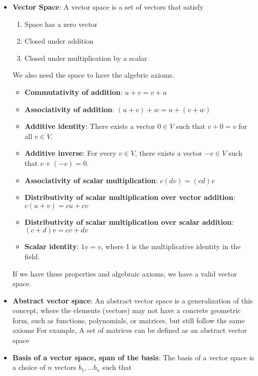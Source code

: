 \documentclass{report}
\begin{document}
    \pagebreak 
    \begin{itemize}
        \item \textbf{Vector Space}: A vector space is a set of vectors that satisfy
            \begin{enumerate}
                \item Space has a zero vector
                \item Closed under addition
                \item Closed under multiplication by a scalar
            \end{enumerate}
            We also need the space to have the algebric axioms.
            \begin{itemize}
                \item \textbf{Commutativity of addition}: \( u + v = v + u \)
                \item \textbf{Associativity of addition}: \( (u + v) + w = u + (v + w) \)
                \item \textbf{Additive identity}: There exists a vector \( 0 \in V \) such that \( v + 0 = v \) for all \( v \in V \).
                \item \textbf{Additive inverse}: For every \( v \in V \), there exists a vector \( -v \in V \) such that \( v + (-v) = 0 \).
                \item \textbf{Associativity of scalar multiplication}: \( c(dv) = (cd)v \)
                \item \textbf{Distributivity of scalar multiplication over vector addition}: \( c(u + v) = cu + cv \)
                \item \textbf{Distributivity of scalar multiplication over scalar addition}: \( (c + d)v = cv + dv \)
                \item \textbf{Scalar identity}: \( 1v = v \), where 1 is the multiplicative identity in the field.
            \end{itemize}
            \bigbreak \noindent 
            If we have these properties and algebraic axioms, we have a valid vector space.
        \item \textbf{Abstract vector space}: An abstract vector space is a generalization of this concept, where the elements (vectors) may not have a concrete geometric form, such as functions, polynomials, or matrices, but still follow the same axioms
            \bigbreak \noindent 
            For example, A set of matrices can be defined as an abstract vector space
        \item \textbf{Basis of a vector space, span of the basis}: The basis of a vector space is a choice of $n$ vectors $b_{1},...b_{n}$ such that

\end{itemize}
\end{document}
